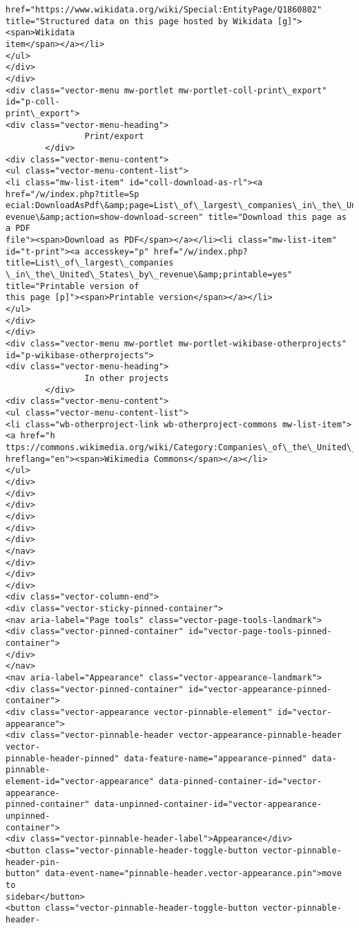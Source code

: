 \documentclass[11pt]{article}
\begin{document}
\begin{Verbatim}[commandchars=\\\{\}]
href="https://www.wikidata.org/wiki/Special:EntityPage/Q1860802"
title="Structured data on this page hosted by Wikidata [g]"><span>Wikidata
item</span></a></li>
</ul>
</div>
</div>
<div class="vector-menu mw-portlet mw-portlet-coll-print\_export" id="p-coll-
print\_export">
<div class="vector-menu-heading">
                Print/export
        </div>
<div class="vector-menu-content">
<ul class="vector-menu-content-list">
<li class="mw-list-item" id="coll-download-as-rl"><a href="/w/index.php?title=Sp
ecial:DownloadAsPdf\&amp;page=List\_of\_largest\_companies\_in\_the\_United\_States\_by\_r
evenue\&amp;action=show-download-screen" title="Download this page as a PDF
file"><span>Download as PDF</span></a></li><li class="mw-list-item"
id="t-print"><a accesskey="p" href="/w/index.php?title=List\_of\_largest\_companies
\_in\_the\_United\_States\_by\_revenue\&amp;printable=yes" title="Printable version of
this page [p]"><span>Printable version</span></a></li>
</ul>
</div>
</div>
<div class="vector-menu mw-portlet mw-portlet-wikibase-otherprojects"
id="p-wikibase-otherprojects">
<div class="vector-menu-heading">
                In other projects
        </div>
<div class="vector-menu-content">
<ul class="vector-menu-content-list">
<li class="wb-otherproject-link wb-otherproject-commons mw-list-item"><a href="h
ttps://commons.wikimedia.org/wiki/Category:Companies\_of\_the\_United\_States"
hreflang="en"><span>Wikimedia Commons</span></a></li>
</ul>
</div>
</div>
</div>
</div>
</div>
</div>
</nav>
</div>
</div>
</div>
<div class="vector-column-end">
<div class="vector-sticky-pinned-container">
<nav aria-label="Page tools" class="vector-page-tools-landmark">
<div class="vector-pinned-container" id="vector-page-tools-pinned-container">
</div>
</nav>
<nav aria-label="Appearance" class="vector-appearance-landmark">
<div class="vector-pinned-container" id="vector-appearance-pinned-container">
<div class="vector-appearance vector-pinnable-element" id="vector-appearance">
<div class="vector-pinnable-header vector-appearance-pinnable-header vector-
pinnable-header-pinned" data-feature-name="appearance-pinned" data-pinnable-
element-id="vector-appearance" data-pinned-container-id="vector-appearance-
pinned-container" data-unpinned-container-id="vector-appearance-unpinned-
container">
<div class="vector-pinnable-header-label">Appearance</div>
<button class="vector-pinnable-header-toggle-button vector-pinnable-header-pin-
button" data-event-name="pinnable-header.vector-appearance.pin">move to
sidebar</button>
<button class="vector-pinnable-header-toggle-button vector-pinnable-header-

\end{Verbatim}
\end{document}
